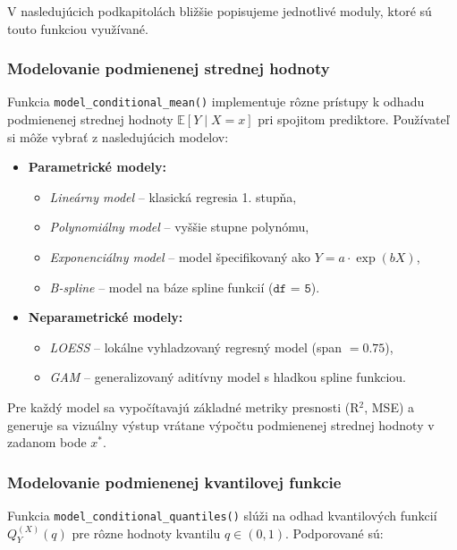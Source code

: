 V nasledujúcich podkapitolách bližšie popisujeme jednotlivé moduly, ktoré sú touto funkciou využívané.

\subsubsection{Modelovanie podmienenej strednej hodnoty}\label{subsec:app_cond_mean}

Funkcia \texttt{model\_conditional\_mean()} implementuje rôzne prístupy k odhadu podmienenej strednej hodnoty $\mathbb{E}[Y \mid X = x]$ pri spojitom prediktore. Používateľ si môže vybrať z nasledujúcich modelov:

\begin{itemize}
  \item \textbf{Parametrické modely:}
  \begin{itemize}
    \item \textit{Lineárny model} – klasická regresia 1. stupňa,
    \item \textit{Polynomiálny model} – vyššie stupne polynómu,
    \item \textit{Exponenciálny model} – model špecifikovaný ako $Y = a \cdot \exp(bX)$,
    \item \textit{B-spline} – model na báze spline funkcií ($\texttt{df = 5}$).
  \end{itemize}
  
  \item \textbf{Neparametrické modely:}
  \begin{itemize}
    \item \textit{LOESS} – lokálne vyhladzovaný regresný model (span $= 0.75$),
    \item \textit{GAM} – generalizovaný aditívny model s hladkou spline funkciou.
  \end{itemize}
\end{itemize}

Pre každý model sa vypočítavajú základné metriky presnosti (R$^2$, MSE) a generuje sa vizuálny výstup vrátane výpočtu podmienenej strednej hodnoty v zadanom bode $x^*$.

\subsubsection{Modelovanie podmienenej kvantilovej funkcie}

Funkcia \texttt{model\_conditional\_quantiles()} slúži na odhad kvantilových funkcií $Q_Y^{(X)}(q)$ pre rôzne hodnoty kvantilu $q \in (0, 1)$. Podporované sú:

